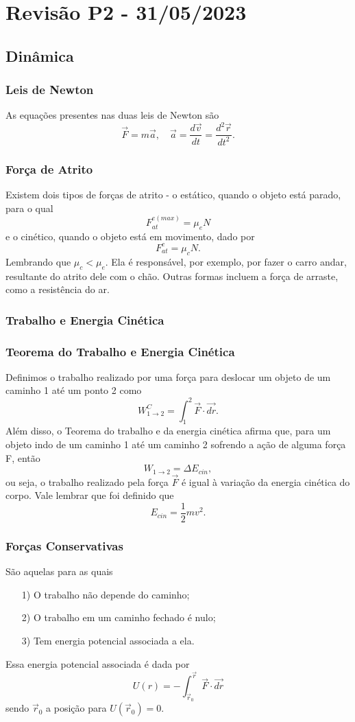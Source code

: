\documentclass[PhysicsI/physics_notes.tex]{subfiles}
\begin{document}
\section{Revisão P2 - 31/05/2023}
\subsection{Dinâmica}
\subsubsection{Leis de Newton}
As equações presentes nas duas leis de Newton são
\[
	\vec{F} = m \vec{a},\quad \vec{a} = \frac{d \vec{v}}{dt}= \frac{d^{2}\vec{r}}{dt^{2}}.
\]
\subsubsection{Força de Atrito}
Existem dois tipos de forças de atrito - o estático, quando o objeto está parado, para o qual
\[
	F_{at}^{e(max)} = \mu_{e}N
\]
e o cinético, quando o objeto está em movimento, dado por
\[
	F_{at}^{c} = \mu_{c}N.
\]
Lembrando que \(\mu_{c} < \mu_{e}\). Ela é responsável, por exemplo, por fazer
o carro andar, resultante do atrito dele com o chão. Outras formas incluem a força de
arraste, como a resistência do ar.

\subsubsection{Trabalho e Energia Cinética}
\subsubsection{Teorema do Trabalho e Energia Cinética}
Definimos o trabalho realizado por uma força para deslocar um objeto de um caminho 1 até
um ponto 2 como
\[
	W_{1\rightarrow2}^{C} = \int_{1}^{2}\vec{F}\cdot \vec{dr}.
\]
Além disso, o Teorema do trabalho e da energia cinética afirma que, para um objeto indo de um
caminho 1 até um caminho 2 sofrendo a ação de alguma força F, então
\[
	W_{1\rightarrow2} = \Delta E_{cin},
\]
ou seja, o trabalho realizado pela força \(\vec{F}\) é igual à variação
da energia cinética do corpo. Vale lembrar que foi definido que
\[
	E_{cin}=\frac{1}{2}mv^{2}.
\]
\subsubsection{Forças Conservativas}
São aquelas para as quais
\begin{itemize}
	\item[1)] O trabalho não depende do caminho;
	\item[2)] O trabalho em um caminho fechado é nulo;
	\item[3)] Tem energia potencial associada a ela.
\end{itemize}
Essa energia potencial associada é dada por
\[
	U(r) = -\int_{\vec{r}_{0}}^{\vec{r}}\vec{F}\cdot \vec{dr}
\]
sendo \(\vec{r}_{0}\) a posição para \(U(\vec{r}_{0}) = 0.\)
\end{document}
